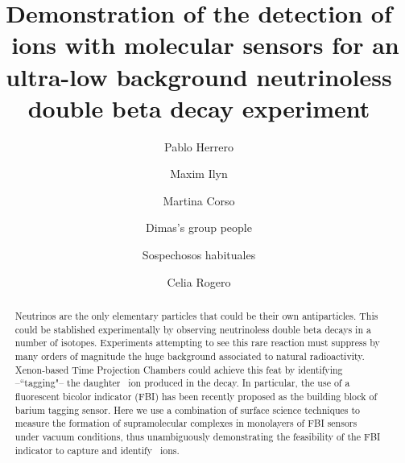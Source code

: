 \documentclass[aps,prl,reprint,longbibliography,superscriptaddress, english]{revtex4-1}
\begin{document}
\title{Demonstration of the detection of \Bapp\ ions with molecular sensors for an ultra-low background neutrinoless double beta decay experiment}

   \author{Pablo Herrero}
   \author{Maxim Ilyn}
    \author{Martina Corso}

    \author{Dimas's group people}
 \author{Sospechosos habituales}

  \author{Celia Rogero}


\begin{abstract}

Neutrinos are the only elementary particles that could be their own antiparticles\cite{Majorana:1937}. This could be stablished experimentally by observing neutrinoless double beta decays in a number of isotopes\cite{GomezCadenas:2010gs}. Experiments attempting to see this rare reaction must suppress by many orders of magnitude the huge background associated to natural radioactivity. Xenon-based Time Projection Chambers could achieve this feat by identifying --``tagging"-- the  daughter \Bapp\ ion produced in the decay\cite{Moe:1991ik,Nygren_2015, Jones:2016qiq, McDonald:2017izm, Chambers:2018srx}. In particular, the use of a fluorescent bicolor indicator (FBI) has been recently proposed as the building block of barium tagging sensor\cite{rivilla_fluorescent_2020}. Here we use a combination of surface science techniques to measure the formation of supramolecular complexes  in monolayers of FBI sensors under vacuum conditions, thus unambiguously demonstrating the feasibility of the FBI indicator to capture and identify \Bapp\ ions. 
\end{abstract}
\end{document}
